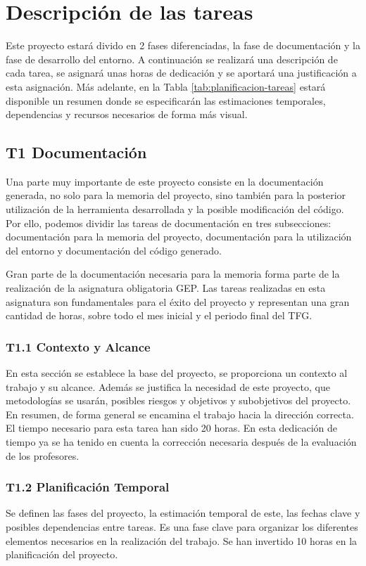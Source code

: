 \section{Descripción de las tareas}
Este proyecto estará divido en 2 fases diferenciadas, la fase de documentación y la fase de desarrollo del entorno. A continuación se realizará una descripción de cada tarea, se asignará unas horas de dedicación y se aportará una justificación a esta asignación. Más adelante, en la Tabla \ref {tab:planificacion-tareas} estará disponible un resumen donde se especificarán las estimaciones temporales, dependencias y recursos necesarios de forma más visual.

\subsection*{T1 Documentación}
Una parte muy importante de este proyecto consiste en la documentación generada, no solo para la memoria del proyecto, sino también para la posterior utilización de la herramienta desarrollada y la posible modificación del código. Por ello, podemos dividir las tareas de documentación en tres subsecciones: documentación para la memoria del proyecto, documentación para la utilización del entorno y documentación del código generado.

Gran parte de la documentación necesaria para la memoria forma parte de la realización de la asignatura obligatoria GEP. Las tareas realizadas en esta asignatura son fundamentales para el éxito del proyecto y representan una gran cantidad de horas, sobre todo el mes inicial y el periodo final del TFG.

\subsubsection*{T1.1 Contexto y Alcance}
En esta sección se establece la base del proyecto, se proporciona un contexto al trabajo y su alcance. Además se justifica la necesidad de este proyecto, que metodologías se usarán, posibles riesgos y objetivos y subobjetivos del proyecto. En resumen, de forma general se encamina el trabajo hacia la dirección correcta. El tiempo necesario para esta tarea han sido 20 horas. En esta dedicación de tiempo ya se ha tenido en cuenta la corrección necesaria después de la evaluación de los profesores.

\subsubsection*{T1.2 Planificación Temporal}
Se definen las fases del proyecto, la estimación temporal de este, las fechas clave y posibles dependencias entre tareas. Es una fase clave para organizar los diferentes elementos necesarios en la realización del trabajo. Se han invertido 10 horas en la planificación del proyecto.

